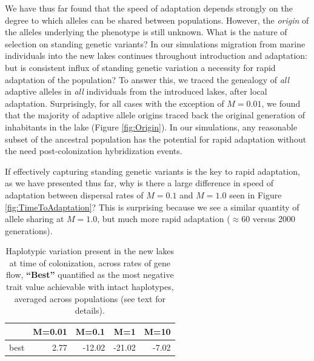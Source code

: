 \documentclass{article}
\begin{document}
We have thus far found that the speed of adaptation depends strongly on the degree to which alleles can be shared between populations. 
However, the \textit{origin} of the alleles underlying the phenotype is still unknown. 
What is the nature of selection on standing genetic variants? 
In our simulations migration from marine individuals into the new lakes continues throughout introduction and adaptation: but is consistent influx of standing genetic variation a necessity for rapid adaptation of the population?
To answer this, we traced the genealogy of \textit{all} adaptive alleles in \textit{all} individuals from the introduced lakes, after local adaptation.
Surprisingly, for all cases with the exception of $M = 0.01$, we found that the majority of adaptive allele origins traced back the original generation of inhabitants in the lake (Figure \ref{fig:Origin}). 
In our simulations,
any reasonable subset of the ancestral population has the potential for rapid adaptation without the need post-colonization hybridization events.

If effectively capturing standing genetic variants is the key to rapid adaptation, as we have presented thus far, why is there a large difference in speed of adaptation between dispersal rates of $M = 0.1$ and $M = 1.0$ seen in Figure \ref{fig:TimeToAdaptation}?
This is surprising because we see a similar quantity of allele sharing at  $M = 1.0$, but much more rapid adaptation ($\approx 60$ versus 2000 generations).

\begin{table}[ht]
    \centering
    \begin{tabular}{rrrrr}
      \hline
     & M=0.01 & M=0.1 & M=1 & M=10 \\ 
      \hline
          best & 2.77 & -12.02 & -21.02 & -7.02 \\ 
       \hline
    \end{tabular}
    \caption{
        Haplotypic variation present in the new lakes at time of colonization,
        across rates of gene flow,
        \textbf{``Best''} 
        quantified as the most negative trait value achievable
        with intact haplotypes, averaged across populations
        (see text for details).
    } \label{tab:linkage}
\end{table}
\end{document}
